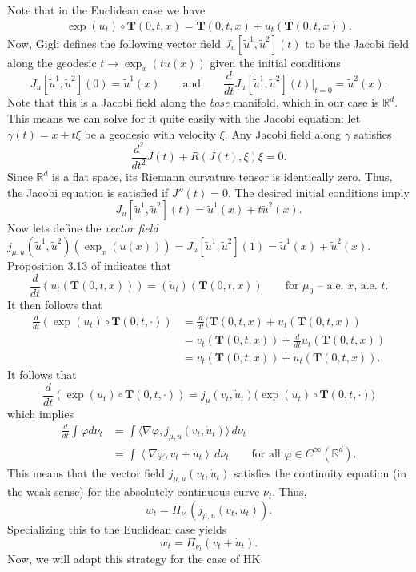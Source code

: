 \documentclass{article}
\begin{document}
Note that in the Euclidean case we have
\begin{align}
    \exp(u_t) \circ \mathbf{T}(0, t, x) = \textbf{T}(0, t, x) + u_t(\textbf{T}(0, t, x)).
\end{align}
Now, Gigli defines the following vector field $J_u[\tilde{u}^1, \tilde{u}^2](t)$ to be the Jacobi field along the geodesic $t \rightarrow \exp_x(tu(x))$ given the initial conditions 
\[J_u[\tilde{u}^1, \tilde{u}^2](0) = \tilde{u}^1(x) \qquad \text{and} \qquad \frac{d}{dt}J_u[\tilde{u}^1, \tilde{u}^2](t)\Big|_{t = 0} = \tilde{u}^2(x).\]
Note that this is a Jacobi field along the \textit{base} manifold, which in our case is $\mathbb{R}^d$. This means we can solve for it quite easily with the Jacobi equation: let $\gamma(t) = x + t\xi$ be a geodesic with velocity $\xi$. Any Jacobi field along $\gamma$ satisfies 
\[\frac{d^2}{dt^2}J(t) + R(J(t), \xi)\xi = 0.\]
Since $\mathbb{R}^d$ is a flat space, its Riemann curvature tensor is identically zero. Thus, the Jacobi equation is satisfied if $J''(t) = 0$. The desired initial conditions imply
\[J_u[\tilde{u}^1, \tilde{u}^2](t) = \tilde{u}^1(x) + t\tilde{u}^2(x).\]
Now lets define the \textit{vector field} $j_{\mu, u}(\tilde{u}^1, \tilde{u}^2)(\exp_x(u(x))) = J_u[\tilde{u}^1, \tilde{u}^2](1) = \tilde{u}^1(x) + \tilde{u}^2(x)$. Proposition 3.13 of \citet{gigli2012second} indicates that
\begin{equation}
    \frac{d}{dt}\left(u_t\left(\mathbf{T}(0, t, x)\right)\right) =(\dot{u}_t)(\mathbf{T}(0, t, x)) \qquad \text{for $\mu_0$ -- a.e. $x$, a.e. $t$}.
\end{equation}
It then follows that
\begin{align}
    \frac{d}{dt}\left(\exp(u_t) \circ \mathbf{T}(0, t, \cdot)\right) &= \frac{d}{dt}(\textbf{T}(0, t, x) + u_t(\textbf{T}(0, t, x)) \\
    &= v_t(\textbf{T}(0, t, x)) + \frac{d}{dt}u_t(\textbf{T}(0, t, x)) \\
    &= v_t(\textbf{T}(0, t, x)) + \dot{u}_t(\textbf{T}(0, t, x)).
\end{align}
It follows that
\[\frac{d}{dt}\left(\exp(u_t) \circ \mathbf{T}(0, t, \cdot)\right) = j_{\mu}(v_t, \dot{u}_t)\Big(\exp(u_t) \circ \mathbf{T}(0, t, \cdot)\Big)\]
which implies
\begin{align}
    \frac{d}{dt}\int \varphi d\nu_t &= \int \bigg\langle \nabla \varphi, j_{\mu, u}(v_t, \dot{u}_t)\bigg\rangle\, d\nu_t \\
    &= \int \left\langle \nabla \varphi, v_t + \dot{u}_t\right\rangle\, d\nu_t \qquad \text{for all } \varphi \in C^{\infty}(\mathbb{R}^d).
\end{align}
This means that the vector field $j_{\mu, u}(v_t, \dot{u}_t)$ satisfies the continuity equation (in the weak sense) for the absolutely continuous curve $\nu_t$. Thus,
\begin{equation}
    w_t = \Pi_{\nu_t}\left(j_{\mu, u}(v_t, \dot{u}_t)\right).
\end{equation}
Specializing this to the Euclidean case yields
\begin{equation}
    w_t = \Pi_{\nu_t}\left(v_t + \dot{u}_t\right).
\end{equation}
Now, we will adapt this strategy for the case of HK. 
\end{document}

